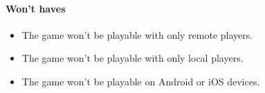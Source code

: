 \paragraph{Won't haves}
\begin{itemize}
	\item The game won't be playable with only remote players.
	\item The game won't be playable with only local players.
	\item The game won't be playable on Android or iOS devices.
\end{itemize}